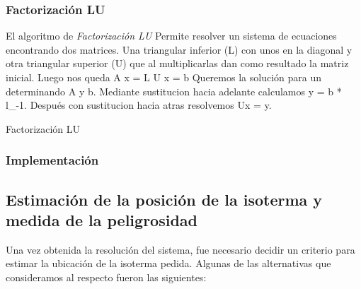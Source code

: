       \subsubsection*{Factorización LU}

        El algoritmo de \emph{Factorización LU} Permite resolver un sistema de ecuaciones encontrando dos matrices. Una triangular inferior (L) con unos en la diagonal y otra triangular superior (U) que al multiplicarlas dan como resultado la matriz inicial. Luego nos queda A x = L U x = b
        Queremos la solución para un determinando A y b. Mediante sustitucion hacia adelante calculamos y = b * l_{-1}. Después con sustitucion hacia atras resolvemos  Ux = y.

        \begin{algorithm}[H]
          \caption{Factorización LU}
        \end{algorithm}

    \subsubsection{Implementación}

  \subsection{Estimación de la posición de la isoterma y medida de la peligrosidad}

    Una vez obtenida la resolución del sistema, fue necesario decidir un criterio para estimar la ubicación de la isoterma pedida. Algunas de las alternativas que consideramos al respecto fueron las siguientes:

